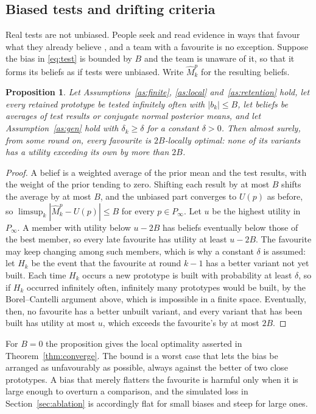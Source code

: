 \documentclass[10pt,twocolumn]{article}
\newtheorem{proposition}{Proposition}
\theoremstyle{definition}
\begin{document}
\subsection{Biased tests and drifting criteria}
\label{sec:bias}

Real tests are not unbiased. People seek and read evidence in ways that favour what they already believe \citep{nickerson1998}, and a team with a favourite is no exception. Suppose the bias in \eqref{eq:test} is bounded by $B$ and the team is unaware of it, so that it forms its beliefs as if tests were unbiased. Write $\widehat M^p_k$ for the resulting beliefs.

\begin{proposition}
\label{prop:bias}
Let Assumptions~\ref{as:finite}, \ref{as:local} and~\ref{as:retention} hold, let every retained prototype be tested infinitely often with $|b_k|\le B$, let beliefs be averages of test results or conjugate normal posterior means, and let Assumption~\ref{as:gen} hold with $\delta_k\ge\delta$ for a constant $\delta>0$. Then almost surely, from some round on, every favourite is $2B$-locally optimal: none of its variants has a utility exceeding its own by more than $2B$.
\end{proposition}

\begin{proof}
A belief is a weighted average of the prior mean and the test results, with the weight of the prior tending to zero. Shifting each result by at most $B$ shifts the average by at most $B$, and the unbiased part converges to $U(p)$ as before, so $\limsup_k|\widehat M^p_k-U(p)|\le B$ for every $p\in P_\infty$. Let $u$ be the highest utility in $P_\infty$. A member with utility below $u-2B$ has beliefs eventually below those of the best member, so every late favourite has utility at least $u-2B$. The favourite may keep changing among such members, which is why a constant $\delta$ is assumed: let $H_k$ be the event that the favourite at round $k-1$ has a better variant not yet built. Each time $H_k$ occurs a new prototype is built with probability at least $\delta$, so if $H_k$ occurred infinitely often, infinitely many prototypes would be built, by the Borel--Cantelli argument above, which is impossible in a finite space. Eventually, then, no favourite has a better unbuilt variant, and every variant that has been built has utility at most $u$, which exceeds the favourite's by at most $2B$.
\end{proof}

For $B=0$ the proposition gives the local optimality asserted in Theorem~\ref{thm:converge}. The bound is a worst case that lets the bias be arranged as unfavourably as possible, always against the better of two close prototypes. A bias that merely flatters the favourite is harmful only when it is large enough to overturn a comparison, and the simulated loss in Section~\ref{sec:ablation} is accordingly flat for small biases and steep for large ones.
\end{document}
